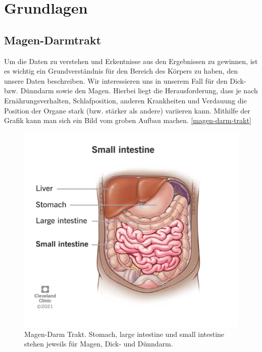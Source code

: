 \section{Grundlagen}\raggedbottom

\subsection{Magen-Darmtrakt}

Um die Daten zu verstehen und Erkentnisse aus den Ergebnissen zu gewinnen, ist es wichtig ein Grundverständnis für den Bereich des Körpers zu haben, den unsere Daten beschreiben. Wir interessieren uns in unserem Fall für den Dick- bzw. Dünndarm sowie den Magen. Hierbei liegt die Herausforderung, dass je nach Ernährungsverhalten, Schlafposition, anderen Krankheiten und Verdauung die Position der Organe stark (bzw. stärker als andere) variieren kann. Mithilfe der Grafik kann man sich ein Bild vom groben Aufbau machen. \autoref{magen-darm-trakt}

\begin{figure}[H]
	\begin{center}
		\includegraphics[width=400pt]{bilder/intestines}
		\caption{Magen-Darm Trakt. Stomach, large intestine und small intestine stehen jeweils für Magen, Dick- und Dünndarm. }\label{magen-darm-trakt}
	\end{center}
\end{figure}

